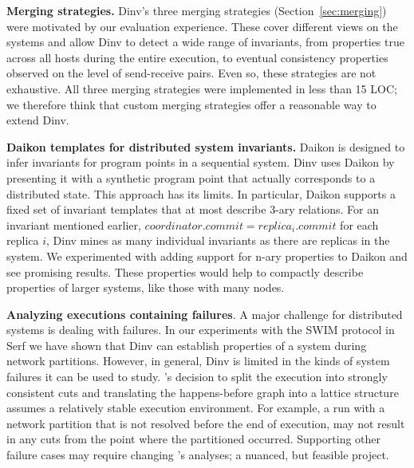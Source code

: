 \textbf{Merging strategies.} Dinv's three merging strategies
(Section~\ref{sec:merging}) were motivated by our evaluation
experience. These cover different views on the systems and allow Dinv
to detect a wide range of invariants, from properties true across all
hosts during the entire execution, to eventual consistency properties
observed on the level of send-receive pairs. Even so, these strategies
are not exhaustive. All three merging strategies were implemented in
less than 15 LOC; we therefore think that custom merging strategies
offer a reasonable way to extend Dinv.


\textbf{Daikon templates for distributed system invariants.}  Daikon
is designed to infer invariants for program points in a sequential
system. Dinv uses Daikon by presenting it with a synthetic program
point that actually corresponds to a distributed state. This approach
has its limits. In particular, Daikon supports a fixed set of
invariant templates that at most describe 3-ary relations. %
For an invariant mentioned earlier, $coordinator.commit =
replica_i.commit$ for each replica $i$, Dinv mines as many individual
invariants as there are replicas in the system.
%
%
We experimented with adding support for n-ary properties to Daikon and
see promising results. These properties would help to compactly
describe properties of larger systems, like those with many nodes.

\textbf{Analyzing executions containing failures}. A major challenge
for distributed systems is dealing with failures. In our experiments
with the SWIM protocol in Serf we have shown that Dinv can establish
properties of a system during network partitions. However, in general,
Dinv is limited in the kinds of system failures it can be used to
study.
%
\dinv's decision to split the execution into strongly consistent cuts
and translating the happens-before graph into a lattice structure
assumes a relatively stable execution environment. For example, a run
with a network partition that is not resolved before the end of
execution, may not result in any cuts from the point where the
partitioned occurred. Supporting other failure cases may require
changing \dinv's analyses; a nuanced, but feasible project.

%

